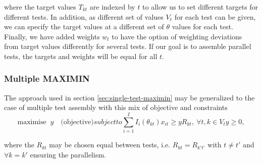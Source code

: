 where the target values $T_{kt}$ are indexed by $t$ to allow us to set different targets for different tests. In addition, as different set of values $V_t$ for each test can be given, we can specify the target values at a different set of $\theta$ values for each test. Finally, we have added weights $w_t$ to have the option of weighting deviations from target values differently for several tests. If our goal is to assemble parallel tests, the targets and weights will be equal for all $t$.

\subsubsection{Multiple MAXIMIN}

The approach used in section \ref{sec:single-test-maximin} may be generalized to the case of multiple test assembly with this mix of objective and constraints
\begin{subequations}
	\begin{equation}
	\mbox{maximise } \ y \quad \mbox{(objective)}
	\end{equation}
	subject to
	
	\begin{equation}\label{eq:MMAXIMIN2}
	\sum_{i=1}^I I_i(\theta_{kt}) x_{it} \ge yR_{kt}, \ \forall t,k \in V_t
	\end{equation}
	\begin{equation*}
	y \ge 0,
	\end{equation*}
	\label{eq:MMAXIMIN}
\end{subequations}

where the $R_{kt}$ may be chosen equal between tests, i.e. $R_{kt}=R_{k't'}$ with $t \ne t'$ and $\forall k=k'$ ensuring the parallelism.
